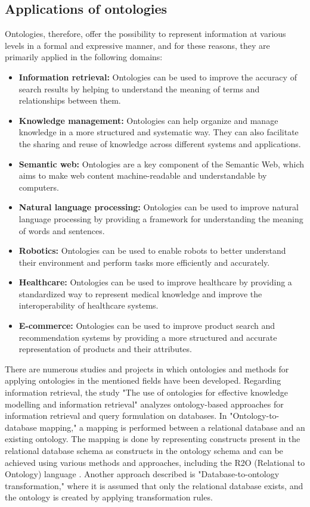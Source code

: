 \subsection{Applications of ontologies}
Ontologies, therefore, offer the possibility to represent information at various levels in a formal and expressive manner, and for these reasons, they are primarily applied in the following domains: \cite{leonels2023ontology}
\begin{itemize}
    \item \textbf{Information retrieval:} Ontologies can be used to improve the accuracy of search results by helping to understand the meaning of terms and relationships between them.

    \item \textbf{Knowledge management:} Ontologies can help organize and manage knowledge in a more structured and systematic way. They can also facilitate the sharing and reuse of knowledge across different systems and applications.

    \item \textbf{Semantic web:} Ontologies are a key component of the Semantic Web, which aims to make web content machine-readable and understandable by computers.

    \item \textbf{Natural language processing:} Ontologies can be used to improve natural language processing by providing a framework for understanding the meaning of words and sentences.

    \item \textbf{Robotics:} Ontologies can be used to enable robots to better understand their environment and perform tasks more efficiently and accurately.

    \item \textbf{Healthcare:} Ontologies can be used to improve healthcare by providing a standardized way to represent medical knowledge and improve the interoperability of healthcare systems.

    \item \textbf{E-commerce:} Ontologies can be used to improve product search and recommendation systems by providing a more structured and accurate representation of products and their attributes.
\end{itemize}
There are numerous studies and projects in which ontologies and methods for applying ontologies in the mentioned fields have been developed. Regarding information retrieval, the study "The use of ontologies for effective knowledge modelling and information retrieval" \cite{munir2018use} analyzes ontology-based approaches for information retrieval and query formulation on databases. In "Ontology-to-database mapping," a mapping is performed between a relational database and an existing ontology. The mapping is done by representing constructs present in the relational database schema as constructs in the ontology schema and can be achieved using various methods and approaches, including the R2O (Relational to Ontology) language \cite{khan2011r2o}. Another approach described is "Database-to-ontology transformation," where it is assumed that only the relational database exists, and the ontology is created by applying transformation rules. \\
